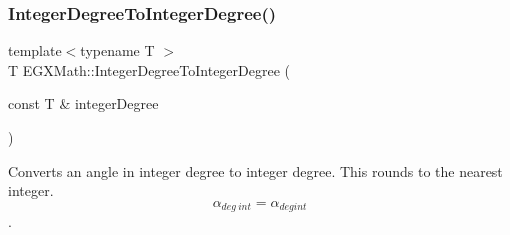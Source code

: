 \subsubsection{\texorpdfstring{Integer\+Degree\+To\+Integer\+Degree()}{IntegerDegreeToIntegerDegree()}}
{\footnotesize\ttfamily template$<$typename T $>$ \\
T E\+G\+X\+Math\+::\+Integer\+Degree\+To\+Integer\+Degree (\begin{DoxyParamCaption}\item[{const T \&}]{integer\+Degree }\end{DoxyParamCaption})}



Converts an angle in integer degree to integer degree. This rounds to the nearest integer. \[\alpha_{deg\ int}=\alpha_{deg int}\]. 

